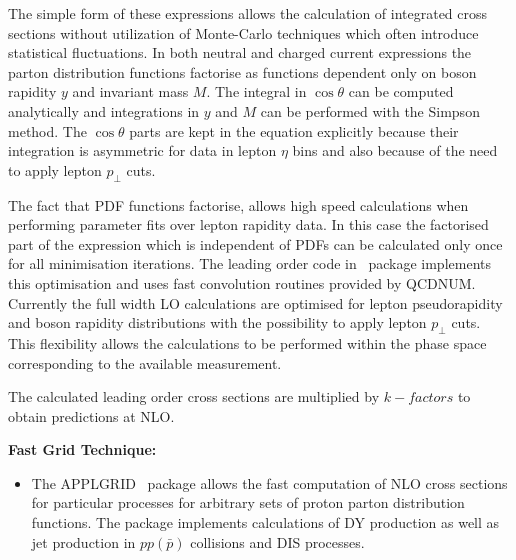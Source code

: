 \begin{description}
\begin{itemize}
The simple form of these expressions allows the calculation of integrated
cross sections without utilization of Monte-Carlo techniques which often 
introduce statistical fluctuations.
In both neutral and charged current expressions the parton distribution functions
factorise as functions dependent only on boson rapidity \(y\) and
invariant mass \(M\).
The integral in \(\cos\theta\) can be computed analytically and
integrations in \(y\) and \(M\) can be performed with the Simpson
method. The \(\cos\theta\) parts are kept in the equation 
explicitly because their integration is asymmetric for
data in lepton \(\eta\) bins and also because of the need to apply 
lepton \(p_{\perp}\) cuts.

The fact that PDF functions factorise, allows high speed calculations when 
performing parameter fits over lepton rapidity data. In this case
the factorised part of the expression which is independent of PDFs can be
calculated only once for all minimisation iterations.
The leading order code in \fitter\ package implements this 
optimisation and uses fast convolution routines provided by
QCDNUM. Currently the full width LO calculations are optimised 
for lepton pseudorapidity and boson rapidity distributions with the
possibility to apply lepton \(p_{\perp}\) cuts.
This flexibility allows the calculations to be performed within the phase space
corresponding to the available measurement.

The calculated leading order cross sections are multiplied by
$k-factors$ to obtain predictions at NLO.
\end{itemize}



\item \bf {Fast Grid Technique:} \rm


\begin{itemize}
\item The APPLGRID~\cite{Carli:2010rw} package allows the fast computation 
of NLO cross sections for particular processes for arbitrary sets of 
proton parton distribution functions. The package implements
calculations of DY production as well as jet production in $pp(\bar p)$
collisions and DIS processes. 


\end{itemize}
\end{description}
